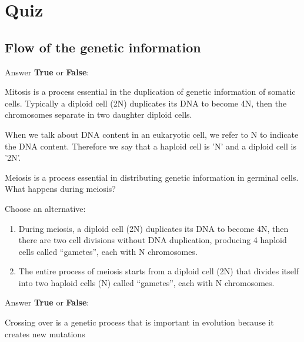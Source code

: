\section{Quiz}

\subsection{Flow of the genetic information}

\begin{Exercise} [
  title={Mitosis},
  difficulty={1},
  label={ex7},
  origin={G. Valle}
 ]

Answer \textbf{True} or \textbf{False}:

  \Question Mitosis is a process essential in the duplication of genetic
information of somatic cells.
Typically a diploid cell (2N) duplicates its DNA to become 4N, then the
chromosomes separate in two daughter diploid cells.

\end{Exercise}

\begin{Exercise} [
  title={Meiosis},
  difficulty={1},
  label={ex8},
  origin={G. Valle}
 ]

  \Question When we talk about DNA content in an eukaryotic cell, we refer to
N to indicate the DNA content.
Therefore we say that a haploid cell is 'N' and a diploid cell is '2N'.

Meiosis is a process essential in distributing genetic information in germinal
cells. What happens during  meiosis?

Choose an alternative:

\begin{enumerate}
  \item During meiosis,  a diploid cell (2N) duplicates its DNA to become 4N,
then there are two cell divisions without DNA duplication, producing 4 haploid
cells called “gametes”, each with N chromosomes.
  \item The entire process of meiosis starts from a diploid cell (2N) that
divides itself into two haploid cells (N) called “gametes”, each with N
chromosomes.
\end{enumerate}

\end{Exercise}

\begin{Exercise} [
  title={Crossing-Over (1)},
  difficulty={1},
  label={ex9},
  origin={G. Valle}
 ]

Answer \textbf{True} or \textbf{False}:

  \Question Crossing over is a genetic process that is important in evolution
because it creates new mutations

\end{Exercise}

